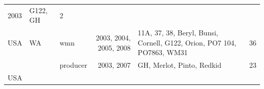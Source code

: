 \documentclass[fleqn,10pt,lineno]{wlpeerj} %
\theoremstyle{definition}
\theoremstyle{definition}
\theoremstyle{definition}
\theoremstyle{remark}
\begin{document}
\begin{longtable}[]{@{}lllrlr@{}}
\begin{minipage}[t]{0.19\columnwidth}
2003\strut
\end{minipage} & \begin{minipage}[t]{0.29\columnwidth}\raggedright\strut
G122, GH\strut
\end{minipage} & \begin{minipage}[t]{0.04\columnwidth}\raggedleft\strut
2\strut
\end{minipage}\tabularnewline
\begin{minipage}[t]{0.11\columnwidth}\raggedright\strut
USA\strut
\end{minipage} & \begin{minipage}[t]{0.08\columnwidth}\raggedright\strut
WA\strut
\end{minipage} & \begin{minipage}[t]{0.12\columnwidth}\raggedright\strut
wmn\strut
\end{minipage} & \begin{minipage}[t]{0.19\columnwidth}\raggedleft\strut
2003, 2004, 2005, 2008\strut
\end{minipage} & \begin{minipage}[t]{0.29\columnwidth}\raggedright\strut
11A, 37, 38, Beryl, Bunsi, Cornell, G122, Orion, PO7 104, PO7863,
WM31\strut
\end{minipage} & \begin{minipage}[t]{0.04\columnwidth}\raggedleft\strut
36\strut
\end{minipage}\tabularnewline
\begin{minipage}[t]{0.11\columnwidth}\raggedright\strut
\strut
\end{minipage} & \begin{minipage}[t]{0.08\columnwidth}\raggedright\strut
\strut
\end{minipage} & \begin{minipage}[t]{0.12\columnwidth}\raggedright\strut
producer\strut
\end{minipage} & \begin{minipage}[t]{0.19\columnwidth}\raggedleft\strut
2003, 2007\strut
\end{minipage} & \begin{minipage}[t]{0.29\columnwidth}\raggedright\strut
GH, Merlot, Pinto, Redkid\strut
\end{minipage} & \begin{minipage}[t]{0.04\columnwidth}\raggedleft\strut
23\strut
\end{minipage}\tabularnewline
\begin{minipage}[t]{0.11\columnwidth}\raggedright\strut
USA\strut

\end{minipage}
\end{longtable}
\end{document}
